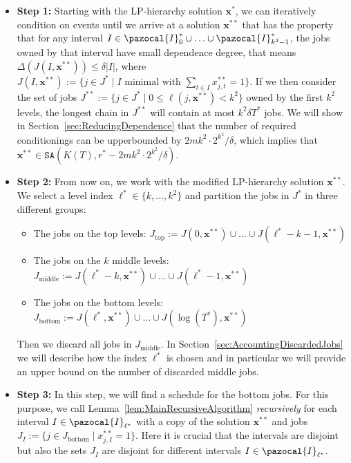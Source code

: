 \documentclass[11pt,letterpaper,oneside,english]{article}
\theoremstyle{theorem}
\begin{document}
\begin{itemize}
\item {\bf Step 1:} Starting with the LP-hierarchy solution $\bm{x}^*$, we can iteratively condition on events 
until we arrive at a solution $\bm{x}^{**}$
that has the property that for any interval $I \in \pazocal{I}_0^* \cup \ldots \cup \pazocal{I}_{k^2-1}^*$, the jobs owned by that interval have small dependence degree, that means $\Delta(J(I,\bm{x}^{**})) \leq \delta |I|$, where $J(I,\bm{x}^{**}) := \{ j \in J^* \mid I\textrm{ minimal with }\sum_{t \in I} x^{**}_{j,t}=1\}$.
If we then consider the set of jobs $J^{**} := \{ j \in J^* \mid 0 \leq \ell(j,\bm{x}^{**}) < k^2 \}$ 
owned by the first $k^2$ levels, the longest chain in $J^{**}$ will contain at most $k^2\delta T^*$ jobs.
We will show in Section~\ref{sec:ReducingDependence} that the number of required conditionings can be upperbounded by $2mk^2 \cdot 2^{k^2} / \delta$, 
which implies that $\bm{x}^{**} \in \texttt{SA}(K(T),r^* - 2mk^2 \cdot 2^{k^2} / \delta)$. \item {\bf Step 2:} From now on, we work with the modified LP-hierarchy solution $\bm{x}^{**}$. We select a 
level index $\ell^* \in \{ k,\ldots,k^2\}$ and partition the jobs in $J^*$ in three different groups: 
  \begin{itemize}
  \item The jobs on the top levels: $J_{\textrm{top}} := J(0,\bm{x}^{**}) \cup \ldots \cup J(\ell^*-k-1,\bm{x}^{**})$
  \item The jobs on the $k$ middle levels: $J_{\textrm{middle}} := J(\ell^*-k,\bm{x}^{**}) \cup \ldots \cup J(\ell^*-1,\bm{x}^{**})$
  \item The jobs on the bottom levels: $J_{\textrm{bottom}} := J(\ell^*,\bm{x}^{**}) \cup \ldots \cup J(\log(T^*),\bm{x}^{**})$
  \end{itemize}
Then we discard all jobs in $J_{\textrm{middle}}$. In Section~\ref{sec:AccountingDiscardedJobs} we will describe how the
index $\ell^*$ is chosen and in particular we will provide an upper bound on the number of 
discarded middle jobs. \item {\bf Step 3:} In this step, we will find a schedule for the bottom jobs. 
For this purpose, we call Lemma~\ref{lem:MainRecursiveAlgorithm} \emph{recursively} for each interval $I \in \pazocal{I}_{\ell^*}$ 
with a copy of the solution $\bm{x}^{**}$ and jobs $J_I := \{ j \in J_{\textrm{bottom}} \mid x_{j,I}^{**} = 1\}$. Here it is crucial that the intervals are disjoint but also 
the sets $J_I$ are disjoint for different intervals $I \in \pazocal{I}_{\ell^*}$.

\end{itemize}
\end{document}
